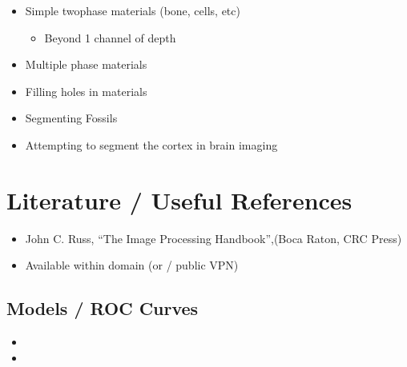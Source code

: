 \documentclass[letterpaper,10pt,english]{sphinxmanual}
\begin{document}
\begin{itemize}
\item {} 
\sphinxAtStartPar
Simple two\sphinxhyphen{}phase materials (bone, cells, etc)
\begin{itemize}
\item {} 
\sphinxAtStartPar
Beyond 1 channel of depth

\end{itemize}

\item {} 
\sphinxAtStartPar
Multiple phase materials

\item {} 
\sphinxAtStartPar
Filling holes in materials

\item {} 
\sphinxAtStartPar
Segmenting Fossils

\item {} 
\sphinxAtStartPar
Attempting to segment the cortex in brain imaging

\end{itemize}




\chapter{Literature / Useful References}
\label{\detokenize{04-BasicSegmentation:literature-useful-references}}\begin{itemize}
\item {} 
\sphinxAtStartPar
John C. Russ, “The Image Processing Handbook”,(Boca Raton, CRC Press)

\item {} 
\sphinxAtStartPar
Available  within domain  (or  / public VPN)

\end{itemize}


\section{Models / ROC Curves}
\label{\detokenize{04-BasicSegmentation:models-roc-curves}}\begin{itemize}
\item {} 
\sphinxAtStartPar
{}

\item {} 
\sphinxAtStartPar
{}

\end{itemize}
\end{document}
